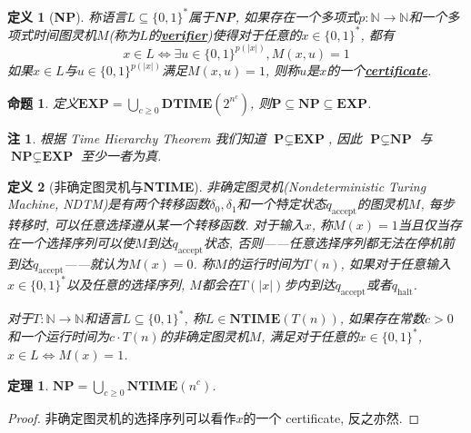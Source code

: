 \documentclass[8pt]{article}
\theoremstyle{compact}
\newtheorem{theorem}{定理}[section]
\newtheorem{definition}{定义}[section]
\newtheorem{proposition}{命题}[section]
\newtheorem{remark}{注}[section]
\def\obj#1{\textbf{\uline{#1}}}
\def\ge{\geqslant}
\def\DTIME{\textbf{DTIME}}
\def\NTIME{\textbf{NTIME}}
\def\P{\textbf{P}}
\def\NP{\textbf{NP}}
\def\EXP{\textbf{EXP}}
\begin{document}
\begin{definition}[\NP]
	称语言$L \subseteq \{0, 1\}^*$属于\NP, 如果存在一个多项式$p: \mathbb N \to \mathbb N$和一个多项式时间图灵机$M$(称为$L$的\obj{verifier})使得对于任意的$x \in \{0, 1\}^*$, 都有
	$$x \in L \Leftrightarrow \exists u \in \{0, 1\}^{p(|x|)}, M(x, u) = 1$$
	如果$x \in L$与$u \in \{0, 1\}^{p(|x|)}$满足$M(x, u) = 1$, 则称$u$是$x$的一个\obj{certificate}. 
\end{definition}
\begin{proposition}
	定义$\EXP = \bigcup_{c \ge 0} \DTIME(2^{n^c})$, 则$\P \subseteq \NP \subseteq \EXP$. 
\end{proposition}
\begin{remark}
	根据 Time Hierarchy Theorem 我们知道 $\P \subsetneq \EXP$, 因此 $\P \subsetneq \NP$ 与 $\NP \subsetneq \EXP$ 至少一者为真.
\end{remark}
\begin{definition}[非确定图灵机与\NTIME]
	非确定图灵机(Nondeterministic Turing Machine, NDTM)是有两个转移函数$\delta_0, \delta_1$和一个特定状态$q_{\text{accept}}$的图灵机$M$, 每步转移时, 可以任意选择遵从某一个转移函数. 对于输入$x$, 称$M(x) = 1$当且仅当存在一个选择序列可以使$M$到达$q_{\text{accept}}$状态, 否则——任意选择序列都无法在停机前到达$q_{\text{accept}}$——就认为$M(x) = 0$. 称$M$的运行时间为$T(n)$, 如果对于任意输入$x \in \{0, 1\}^*$以及任意的选择序列, $M$都会在$T(|x|)$步内到达$q_{\text{accept}}$或者$q_{\text{halt}}$. 

	对于$T: \mathbb N \to \mathbb N$和语言$L \subseteq \{0, 1\}^*$, 称$L \in \NTIME(T(n))$, 如果存在常数$c > 0$和一个运行时间为$c \cdot T(n)$的非确定图灵机$M$, 满足对于任意的$x \in \{0, 1\}^*$, $x \in L \Leftrightarrow M(x) = 1$. 
\end{definition}
\begin{theorem}
	$\NP = \bigcup_{c \ge 0} \NTIME(n^c)$. 
\end{theorem}
\begin{proof}
	非确定图灵机的选择序列可以看作$x$的一个 certificate, 反之亦然. 
\end{proof}
\end{document}
